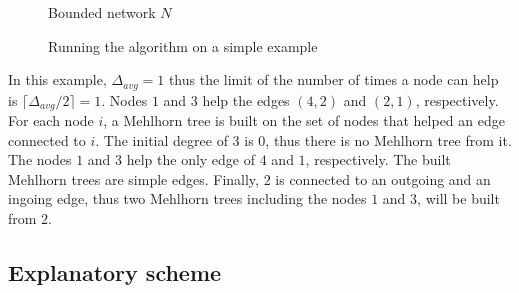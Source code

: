 \documentclass{article}
\begin{document}
\begin{figure}[!htb]
\begin{minipage}[b]{.3\linewidth}
\begin{adjustbox}{width=\linewidth}
  \end{adjustbox}
  \caption*{Bounded network $N$}
\end{minipage}
\caption{Running the algorithm on a simple example}
\end{figure}

In this example, $\Delta_{avg} = 1$ thus the limit of the number of times a node can help
is $\lceil\Delta_{avg}/2\rceil = 1$. 
Nodes $1$ and $3$ help the edges $(4,2)$ and $(2,1)$, respectively.
For each node $i$, a Mehlhorn tree is built on the set of nodes that
helped an edge connected to $i$.
The initial degree of $3$ is $0$, thus there is no Mehlhorn tree from it.
The nodes $1$ and $3$ help the only edge of $4$ and $1$, respectively.
The built Mehlhorn trees are simple edges.
Finally, $2$ is connected to an outgoing and an ingoing edge, thus two
Mehlhorn trees including the nodes $1$ and $3$, will be built from $2$.

\newpage

\subsection{Explanatory scheme}

\begin{figure}[!htb]\centering
  \begin{minipage}[b]{.45\linewidth}
    \begin{adjustbox}{width=\linewidth}
    \end{adjustbox}
  \end{minipage}
\end{figure}
\end{document}

